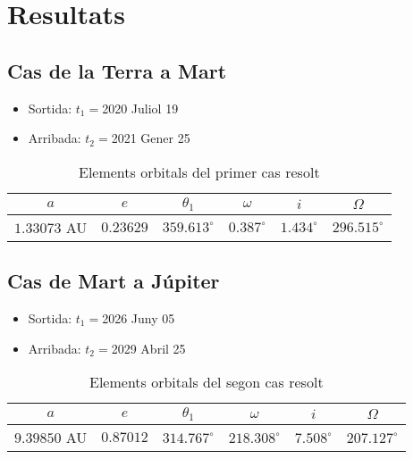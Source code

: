 \chapter{Resultats}

\section{Cas de la Terra a Mart}
\begin{itemize}
	\item Sortida: $t_{1}=$2020 Juliol 19
	\item Arribada: $t_{2}=$2021 Gener 25
\end{itemize}
\begin{table}[h!]
	\centering
	\begin{tabular}{ |c|c|c|c|c|c|}
		\hline
		$a$ & $e$ & $\theta_{1}$ & $\omega$ & $i$ & $\Omega$ \\ \hline
		$1.33073$ AU  & $0.23629$ & $359.613^{\circ}$ & $0.387^{\circ}$ & $1.434^{\circ}$ & $296.515^{\circ}$ \\ \hline
	\end{tabular}
	\caption{Elements orbitals del primer cas resolt}
\end{table}

\section{Cas de Mart a Júpiter}
\begin{itemize}
	\item Sortida: $t_{1}=$2026 Juny 05
	\item Arribada: $t_{2}=$2029 Abril 25
\end{itemize}
\begin{table}[h!]
	\centering
	\begin{tabular}{ |c|c|c|c|c|c|}
		\hline
		$a$ & $e$ & $\theta_{1}$ & $\omega$ & $i$ & $\Omega$ \\ \hline
		$9.39850$ AU  & $0.87012$ & $314.767^{\circ}$ & $218.308^{\circ}$ & $7.508^{\circ}$ & $207.127^{\circ}$ \\ \hline
	\end{tabular}
	\caption{Elements orbitals del segon cas resolt}
\end{table}

